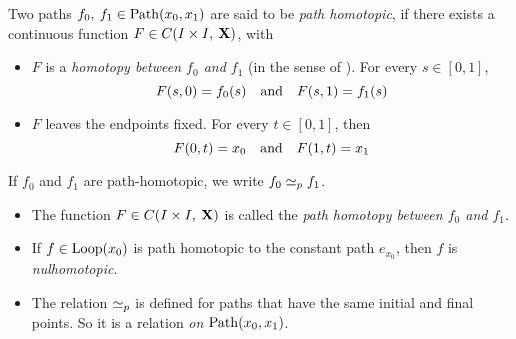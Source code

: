 \documentclass[../main-manifolds.tex]{subfiles}
\begin{document}
\begin{definition}\label{munkres:path-homotopy}
    Two paths $f_0,\: f_1\in\Path[x_0,x_1]$ are said to be \emph{path homotopic}, if there exists a continuous function $F\in C(I\times I,\: {\mathbf{X}})$, with
    \begin{itemize}
        \item $F$ is a \emph{homotopy between $f_0$ and $f_1$} (in the sense of ). For every $s\in [0,1]$,
        \begin{equation}\label{munkres:path-homotopy-deformation}
            F(s,0)=f_0(s)\qqtext{and}F(s,1)=f_1(s)
        \end{equation}
        \item $F$ leaves the endpoints fixed. For every $t\in[0,1]$, then
        \begin{equation}\label{munkres:path-homotopy-endpoints}
            F(0,t)=x_0\qqtext{and}F(1,t)=x_1
        \end{equation}
    \end{itemize}
    If $f_0$ and $f_1$ are path-homotopic, we write $f_0\simeq_p f_1$.\\

    \begin{itemize}
        \item The function $F\in C(I\times I,\: {\mathbf{X}})$ is called the \emph{path homotopy between $f_0$ and $f_1$}. 
        \item If $f\in\Loop[x_0]$ is path homotopic to the constant path $e_{x_0}$, then $f$ is \emph{nulhomotopic}.
        \item The relation $\simeq_p$ is defined for paths that have the same initial and final points. So it is a relation \emph{on} $\Path[x_0,x_1]$.
    \end{itemize}
\end{definition}
\end{document}
